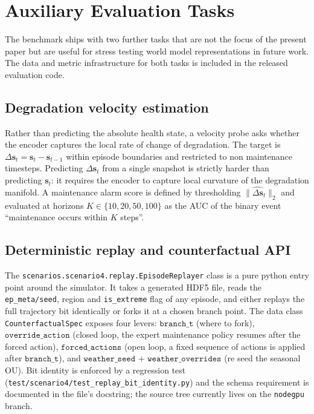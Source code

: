 
\section{Auxiliary Evaluation Tasks}
\label{sec:auxiliary_tasks}

The benchmark ships with two further tasks that are not the focus of
the present paper but are useful for stress testing world model
representations in future work. The data and metric infrastructure for
both tasks is included in the released evaluation code.

\subsection{Degradation velocity estimation}
Rather than predicting the absolute health state, a velocity probe
asks whether the encoder captures the local rate of change of
degradation. The target is $\Delta\mathbf{s}_t = \mathbf{s}_t -
\mathbf{s}_{t-1}$ within episode boundaries and restricted to non
maintenance timesteps. Predicting $\Delta\mathbf{s}_t$ from a single
snapshot is strictly harder than predicting $\mathbf{s}_t$: it requires
the encoder to capture local curvature of the degradation manifold.
A maintenance alarm score is defined by thresholding
$\|\widehat{\Delta\mathbf{s}}_t\|_2$ and evaluated at horizons
$K \in \{10, 20, 50, 100\}$ as the AUC of the binary event
``maintenance occurs within $K$ steps''.

\subsection{Deterministic replay and counterfactual API}
\label{sec:replayer}

The \texttt{scenarios.scenario4.replay.EpisodeReplayer} class is a
pure python entry point around the simulator. It takes a generated
HDF5 file, reads the \texttt{ep\_meta/seed}, region and
\texttt{is\_extreme} flag of any episode, and either replays the full
trajectory bit identically or forks it at a chosen branch point. The
data class \texttt{CounterfactualSpec} exposes four levers:
$\texttt{branch\_t}$ (where to fork), $\texttt{override\_action}$
(closed loop, the expert maintenance policy resumes after the forced
action), $\texttt{forced\_actions}$ (open loop, a fixed sequence of
actions is applied after $\texttt{branch\_t}$), and
$\texttt{weather\_seed}$ + $\texttt{weather\_overrides}$ (re seed the
seasonal OU). Bit identity is enforced by a regression test
(\texttt{test/scenario4/test\_replay\_bit\_identity.py}) and the
schema requirement is documented in the file's docstring; the source
tree currently lives on the \texttt{nodegpu} branch.

